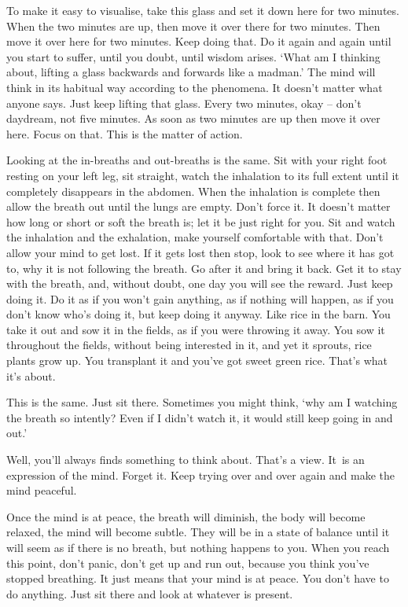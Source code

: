  To make it easy to visualise, take this glass and set it down here for two minutes. When the two minutes are up, then move it over there for two minutes. Then move it over here for two minutes. Keep doing that. Do it again and again until you start to suffer, until you doubt, until wisdom arises. `What am I thinking about, lifting a glass backwards and forwards like a madman.' The mind will think in its habitual way according to the phenomena. It doesn't matter what anyone says. Just keep lifting that glass. Every two minutes, okay -- don't daydream, not five minutes. As soon as two minutes are up then move it over here. Focus on that. This is the matter of action. 

 Looking at the in-breaths and out-breaths is the same. Sit with your right foot resting on your left leg, sit straight, watch the inhalation to its full extent until it completely disappears in the abdomen. When the inhalation is complete then allow the breath out until the lungs are empty. Don't force it. It doesn't matter how long or short or soft the breath is; let it be just right for you. Sit and watch the inhalation and the exhalation, make yourself comfortable with that. Don't allow your mind to get lost. If it gets lost then stop, look to see where it has got to, why it is not following the breath. Go after it and bring it back. Get it to stay with the breath, and, without doubt, one day you will see the reward. Just keep doing it. Do it as if you won't gain anything, as if nothing will happen, as if you don't know who's doing it, but keep doing it anyway. Like rice in the barn. You take it out and sow it in the fields, as if you were throwing it away. You sow it throughout the fields, without being interested in it, and yet it sprouts, rice plants grow up. You transplant it and you've got sweet green rice. That's what it's about. 

 This is the same. Just sit there. Sometimes you might think, `why am I watching the breath so intently? Even if I didn't watch it, it would still keep going in and out.' 

 Well, you'll always finds something to think about. That's a view. It~is an expression of the mind. Forget it. Keep trying over and over again and make the mind peaceful. 

 Once the mind is at peace, the breath will diminish, the body will become relaxed, the mind will become subtle. They will be in a state of balance until it will seem as if there is no breath, but nothing happens to you. When you reach this point, don't panic, don't get up and run out, because you think you've stopped breathing. It just means that your mind is at peace. You don't have to do anything. Just sit there and look at whatever is present. 

